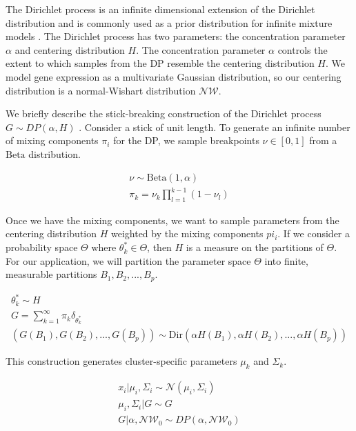 \documentclass[10pt,letterpaper]{article}
\begin{document}
The Dirichlet process is an infinite dimensional extension of the Dirichlet distribution and is commonly used as a prior distribution for infinite mixture models \cite{muller2004nonparametric, gorurDirichletProcessGaussian2010}. The Dirichlet process has two parameters: the concentration parameter $\alpha$ and centering distribution $H$. The concentration parameter $\alpha$ controls the extent to which samples from the DP resemble the centering distribution $H$. We model gene expression as a multivariate Gaussian distribution, so our centering distribution is a normal-Wishart distribution $\mathcal{NW}$.

We briefly describe the stick-breaking construction of the Dirichlet process $G \sim DP(\alpha, H)$ \cite{hughes2013memoized, teh2010dirichlet, gelmanBayesianDataAnalysis2013}. Consider a stick of unit length. To generate an infinite number of mixing components $\pi_i$ for the DP, we sample breakpoints $\nu \in [0, 1]$ from a $\text{Beta}$ distribution. 

\begin{gather}
\label{eq:dp}
\nu \sim \text{Beta}(1, \alpha) \\
\pi_k = \nu_k \prod_{l=1}^{k-1}(1 - \nu_l)
\end{gather}

Once we have the mixing components, we want to sample parameters from the centering distribution $H$ weighted by the mixing components $pi_i$. If we consider a probability space $\Theta$ where $\theta_k^{*} \in \Theta$, then $H$ is a measure on the partitions of $\Theta$. For our application, we will partition the parameter space $\Theta$ into finite, measurable partitions $B_1, B_2, ..., B_p$. 

\begin{gather}
\theta_k^{*} \sim H \\
G = \sum_{k=1}^{\infty} \pi_k \delta_{\theta_k^{*}} \\
(G(B_1), G(B_2), ..., G(B_p)) \sim \text{Dir}(\alpha H(B_1), \alpha H(B_2), ..., \alpha H(B_p)) 
\end{gather}

This construction generates cluster-specific parameters $\mu_k$ and $\Sigma_k$.

\begin{gather}
\label{eq:mm}
x_i | \mu_i, \Sigma_i \sim \mathcal{N}(\mu_i, \Sigma_i) \\
\mu_i, \Sigma_i | G \sim G \\
G | \alpha, \mathcal{NW}_0 \sim DP(\alpha, \mathcal{NW}_0)
\end{gather}
\end{document}
